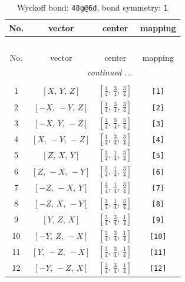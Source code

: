 \documentclass[fleqn,8pt]{jsarticle}
\begin{document}
\begin{longtable}{cccc}
\caption{Wyckoff bond: {\tt 48g@6d}, bond symmetry: {\tt 1}}
 \\
 \hline \hline
No. & vector & center & mapping \\ \hline \endfirsthead

\multicolumn{3}{l}{\tablename\ \thetable{}} \\
 \hline \hline
No. & vector & center & mapping \\ \hline \endhead

 \hline \hline
\multicolumn{3}{r}{\footnotesize\it continued ...} \\ \endfoot

 \hline \hline
\multicolumn{3}{r}{} \\ \endlastfoot

1 & $\left[ X,\, Y,\, Z \right]$ & $\left[ \frac{1}{4},\, \frac{3}{4},\, \frac{3}{4} \right]$ & {\tt [1]} \\ \hline
2 & $\left[ - X,\, - Y,\, Z \right]$ & $\left[ \frac{1}{4},\, \frac{3}{4},\, \frac{3}{4} \right]$ & {\tt [2]} \\ \hline
3 & $\left[ - X,\, Y,\, - Z \right]$ & $\left[ \frac{1}{4},\, \frac{3}{4},\, \frac{3}{4} \right]$ & {\tt [3]} \\ \hline
4 & $\left[ X,\, - Y,\, - Z \right]$ & $\left[ \frac{1}{4},\, \frac{3}{4},\, \frac{3}{4} \right]$ & {\tt [4]} \\ \hline
5 & $\left[ Z,\, X,\, Y \right]$ & $\left[ \frac{3}{4},\, \frac{1}{4},\, \frac{3}{4} \right]$ & {\tt [5]} \\ \hline
6 & $\left[ Z,\, - X,\, - Y \right]$ & $\left[ \frac{3}{4},\, \frac{1}{4},\, \frac{3}{4} \right]$ & {\tt [6]} \\ \hline
7 & $\left[ - Z,\, - X,\, Y \right]$ & $\left[ \frac{3}{4},\, \frac{1}{4},\, \frac{3}{4} \right]$ & {\tt [7]} \\ \hline
8 & $\left[ - Z,\, X,\, - Y \right]$ & $\left[ \frac{3}{4},\, \frac{1}{4},\, \frac{3}{4} \right]$ & {\tt [8]} \\ \hline
9 & $\left[ Y,\, Z,\, X \right]$ & $\left[ \frac{3}{4},\, \frac{3}{4},\, \frac{1}{4} \right]$ & {\tt [9]} \\ \hline
10 & $\left[ - Y,\, Z,\, - X \right]$ & $\left[ \frac{3}{4},\, \frac{3}{4},\, \frac{1}{4} \right]$ & {\tt [10]} \\ \hline
11 & $\left[ Y,\, - Z,\, - X \right]$ & $\left[ \frac{3}{4},\, \frac{3}{4},\, \frac{1}{4} \right]$ & {\tt [11]} \\ \hline
12 & $\left[ - Y,\, - Z,\, X \right]$ & $\left[ \frac{3}{4},\, \frac{3}{4},\, \frac{1}{4} \right]$ & {\tt [12]} \\ \hline

\end{longtable}
\end{document}

